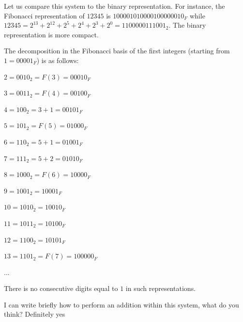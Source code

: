 Let us compare this system to the binary representation.
For instance, the Fibonacci representation of $12345$ is $100001010000100000010_F$
while  $12345 = 2^{13} + 2^{12} + 2^{5} + 2^{4} + 2^{3} + 2^{0} = 1100000111001_2$.
The binary representation is more compact. 
\bigskip

The decomposition in the Fibonacci basis of the first integers (starting from $1 = 00001_F$) is as follows:

 $2 = 0010_2 = F(3) = 00010_F$
 
 $3 = 0011_2 = F(4) = 00100_F$
  
 $4 = 100_2 = 3+1 = 00101_F$
 
 $5 = 101_2 = F(5) = 01000_F$
 
 $6 = 110_2 = 5+1 = 01001_F$
 
 $7 = 111_2 = 5+2 = 01010_F$
 
 $8 = 1000_2 = F(6) = 10000_F$
 
 $9 = 1001_2 = 10001_F$
 
 $10 = 1010_2 = 10010_F$
 
 $11 = 1011_2 = 10100_F$
 
 $12 = 1100_2 = 10101_F$
 
 $13 = 1101_2 = F(7) = 100000_F$
 
 ...
 
There is no consecutive digits equal to $1$ in such representations.
\medskip

{\Denis I can write briefly how to perform an addition within this system, what do you think?}
{\Arny Definitely yes}

